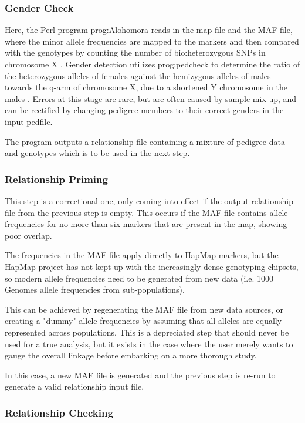 \subsubsection{Gender Check}

Here, the Perl program \gls{prog:Alohomora} reads in the map file and the MAF file, where the minor allele frequencies are mapped to the markers and then compared with the genotypes by counting the number of \gls{bio:heterozygous} SNPs in chromosome X \cite{ruschendorf2005alohomora}. Gender detection utilizes \gls{prog:pedcheck} to determine the ratio of the heterozygous alleles of females against the hemizygous alleles of males towards the q-arm of chromosome X, due to a shortened Y chromosome in the males \cite{o1998pedcheck}. Errors at this stage are rare, but are often caused by sample mix up, and can be rectified by changing pedigree members to their correct genders in the input pedfile.

The program outputs a relationship file containing a mixture of pedigree data and genotypes which is to be used in the next step.

\subsubsection{Relationship Priming}

This step is a correctional one, only coming into effect if the output relationship file from the previous step is empty. This occurs if the MAF file contains allele frequencies for no more than six markers that are present in the map, showing poor overlap.

The frequencies in the MAF file apply directly to HapMap markers, but the HapMap project has not kept up with the increasingly dense genotyping chipsets, so modern allele frequencies need to be generated from new data (i.e. 1000 Genomes allele frequencies from sub-populations).

This can be achieved by regenerating the MAF file from new data sources, or creating a "dummy" allele frequencies by assuming that all alleles are equally represented across populations. This is a depreciated step that should never be used for a true analysis, but it exists in the case where the user merely wants to gauge the overall linkage before embarking on a more thorough study.

In this case, a new MAF file is generated and the previous step is re-run to generate a valid relationship input file.

\subsubsection{Relationship Checking}

